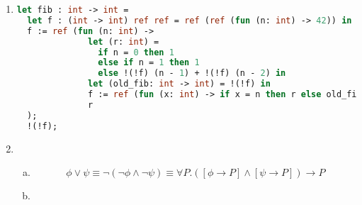 \documentclass[10pt, oneside]{article}
\begin{document}
\begin{enumerate}[1.]
	\item
	\begin{lstlisting}[language = ML]
let fib : int -> int = 
  let f : (int -> int) ref ref = ref (ref (fun (n: int) -> 42)) in 
  f := ref (fun (n: int) -> 
              let (r: int) = 
                if n = 0 then 1
                else if n = 1 then 1
                else !(!f) (n - 1) + !(!f) (n - 2) in
              let (old_fib: int -> int) = !(!f) in
              f := ref (fun (x: int) -> if x = n then r else old_fib x);
              r
  );
  !(!f);
	\end{lstlisting}

	\item
	\begin{enumerate}[(a)]
		\item 
		$$\phi \vee \psi \equiv \neg (\neg \phi \wedge \neg \psi) \equiv \forall P. ([\phi \rightarrow P] \wedge [\psi \rightarrow P]) \rightarrow P$$
%					
%						
		\item
		

\end{enumerate}
\end{enumerate}
\end{document}
